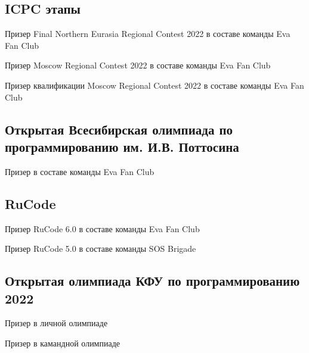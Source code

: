 \documentclass[a4paper,14pt]{article}
\begin{document}
\vspace*{10pt}
\subsection{ICPC этапы}
\begin{zitemize}
\item Призер Final Northern Eurasia Regional Contest 2022 в составе команды Eva Fan Club
\item Призер Moscow Regional Contest 2022 в составе команды Eva Fan Club
\item Призер квалификации Moscow Regional Contest 2022 в составе команды Eva Fan Club
\end{zitemize}


\vspace*{6pt}
\subsection{Открытая Всесибирская олимпиада по программированию им. И.В. Поттосина}
\begin{zitemize}
\item Призер в составе команды Eva Fan Club
\end{zitemize}

\vspace*{6pt}
\subsection{RuCode}
\begin{zitemize}
\item Призер RuCode 6.0 в составе команды Eva Fan Club
\item Призер RuCode 5.0 в составе команды SOS Brigade
\end{zitemize}

\vspace*{6pt}
\subsection{Открытая олимпиада КФУ по программированию 2022}
\begin{zitemize}
\item Призер в личной олимпиаде
\item Призер в камандной олимпиаде
\end{zitemize}
\end{document}
